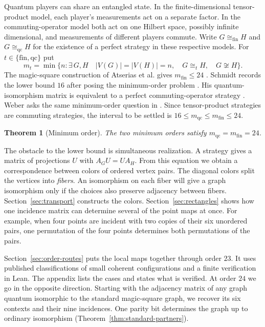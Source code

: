 \documentclass[11pt,reqno]{amsart}
\numberwithin{equation}{section}
\newtheorem{theorem}{Theorem}[section]
\theoremstyle{definition}
\newcommand{\qc}{\mathrm{qc}}
\newcommand{\qf}{\mathrm{fin}}
\begin{document}
Quantum players can share an entangled state. In the finite-dimensional tensor-product model, each player's measurements act on a separate factor. In the commuting-operator model both act on one Hilbert space, possibly infinite dimensional, and measurements of different players commute. Write $G\cong_{\qf}H$ and $G\cong_{\qc}H$ for the existence of a perfect strategy in these respective models. For $t\in\{\qf,\qc\}$ put
\[
 m_t=\min\bigl\{n:\exists\,G,H\quad
         |V(G)|=|V(H)|=n,\quad G\cong_t H,\quad G\not\cong H\bigr\}.
\]
The magic-square construction of Atserias et al. gives $m_{\qf}\le24$ \cite[\S6]{AMRSSV}. Schmidt records the lower bound $16$ after posing the minimum-order problem \cite[Question~8.5.1 and the following paragraph]{Schmidt}. His quantum-isomorphism matrix is equivalent to a perfect commuting-operator strategy \cite[Thm.~4.4]{LMR}. Weber asks the same minimum-order question in \cite[Problem~3.12]{Weber}. Since tensor-product strategies are commuting strategies, the interval to be settled is $16\le m_{\qc}\le m_{\qf}\le24$.

\begin{theorem}[Minimum order]\label{thm:main}
The two minimum orders satisfy $m_{\qc}=m_{\qf}=24$.
\end{theorem}

The obstacle to the lower bound is simultaneous realization. A strategy gives a matrix of projections $U$ with $A_GU=UA_H$. From this equation we obtain a correspondence between colors of ordered vertex pairs. The diagonal colors split the vertices into \emph{fibers}. An isomorphism on each fiber will give a graph isomorphism only if the choices also preserve adjacency between fibers. Section~\ref{sec:transport} constructs the colors. Section~\ref{sec:rectangles} shows how one incidence matrix can determine several of the point maps at once. For example, when four points are incident with two copies of their six unordered pairs, one permutation of the four points determines both permutations of the pairs.

Section~\ref{sec:order-routes} puts the local maps together through order $23$. It uses published classifications of small coherent configurations and a finite verification in Lean. The appendix lists the cases and states what is verified. At order $24$ we go in the opposite direction. Starting with the adjacency matrix of any graph quantum isomorphic to the standard magic-square graph, we recover its six contexts and their nine incidences. One parity bit determines the graph up to ordinary isomorphism (Theorem~\ref{thm:standard-partners}).
\end{document}
